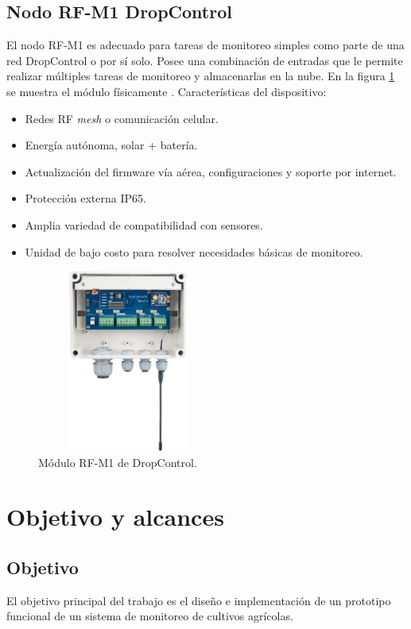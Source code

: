 \subsection{Nodo RF-M1 DropControl}

El nodo RF-M1 es adecuado para tareas de monitoreo simples como parte de una red DropControl o por sí solo. Posee una combinación de entradas que le permite realizar múltiples tareas de monitoreo y almacenarlas en la nube. En la figura \ref{fig:Modulo-Dropcontrol} se muestra el módulo físicamente \citep{ModuloAgricultureDos}.
Características del dispositivo: 
\begin{itemize}
  \item Redes RF \textit{mesh} o comunicación celular.
  \item Energía autónoma, solar + batería.
  \item Actualización del firmware vía aérea, configuraciones y soporte por internet.
  \item Protección externa IP65.
  \item Amplia variedad de compatibilidad con sensores.
  \item Unidad de bajo costo para resolver necesidades básicas de monitoreo. 
\end{itemize}

\begin{figure}[htbp]
	\centering
	\includegraphics[width=6cm, height=6cm]{./Figures/modulo_dropcontrol.png}
	\caption{Módulo RF-M1 de DropControl.}
	\label{fig:Modulo-Dropcontrol}
\end{figure}

\section{Objetivo y alcances}

\subsection{Objetivo}
El objetivo principal del trabajo es el diseño e implementación de un prototipo funcional de un sistema de monitoreo de cultivos agrícolas.
